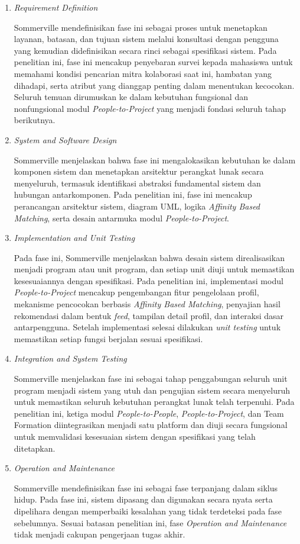 \begin{enumerate}
\item \emph{Requirement Definition}

Sommerville mendefinisikan fase ini sebagai proses untuk menetapkan layanan, batasan, dan tujuan sistem melalui konsultasi dengan pengguna yang kemudian didefinisikan secara rinci sebagai spesifikasi sistem. Pada penelitian ini, fase ini mencakup penyebaran survei kepada mahasiswa untuk memahami kondisi pencarian mitra kolaborasi saat ini, hambatan yang dihadapi, serta atribut yang dianggap penting dalam menentukan kecocokan. Seluruh temuan dirumuskan ke dalam kebutuhan fungsional dan nonfungsional modul \emph{People-to-Project} yang menjadi fondasi seluruh tahap berikutnya.

\item \emph{System and Software Design}

Sommerville menjelaskan bahwa fase ini mengalokasikan kebutuhan ke dalam komponen sistem dan menetapkan arsitektur perangkat lunak secara menyeluruh, termasuk identifikasi abstraksi fundamental sistem dan hubungan antarkomponen. Pada penelitian ini, fase ini mencakup perancangan arsitektur sistem, diagram UML, logika \emph{Affinity Based Matching}, serta desain antarmuka modul \emph{People-to-Project}.

\item \emph{Implementation and Unit Testing}

Pada fase ini, Sommerville menjelaskan bahwa desain sistem direalisasikan menjadi program atau unit program, dan setiap unit diuji untuk memastikan kesesuaiannya dengan spesifikasi. Pada penelitian ini, implementasi modul \emph{People-to-Project} mencakup pengembangan fitur pengelolaan profil, mekanisme pencocokan berbasis \emph{Affinity Based Matching}, penyajian hasil rekomendasi dalam bentuk \emph{feed}, tampilan detail profil, dan interaksi dasar antarpengguna. Setelah implementasi selesai dilakukan \emph{unit testing} untuk memastikan setiap fungsi berjalan sesuai spesifikasi.

\item \emph{Integration and System Testing}

Sommerville menjelaskan fase ini sebagai tahap penggabungan seluruh unit program menjadi sistem yang utuh dan pengujian sistem secara menyeluruh untuk memastikan seluruh kebutuhan perangkat lunak telah terpenuhi. Pada penelitian ini, ketiga modul \emph{People-to-People}, \emph{People-to-Project}, dan Team Formation diintegrasikan menjadi satu platform dan diuji secara fungsional untuk memvalidasi kesesuaian sistem dengan spesifikasi yang telah ditetapkan.

\item \emph{Operation and Maintenance}

Sommerville mendefinisikan fase ini sebagai fase terpanjang dalam siklus hidup. Pada fase ini, sistem dipasang dan digunakan secara nyata serta dipelihara dengan memperbaiki kesalahan yang tidak terdeteksi pada fase sebelumnya. Sesuai batasan penelitian ini, fase \emph{Operation and Maintenance} tidak menjadi cakupan pengerjaan tugas akhir.

\end{enumerate}

